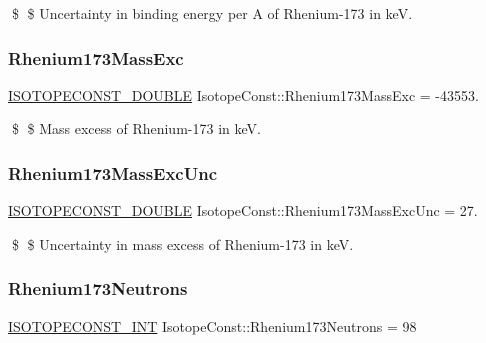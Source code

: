 \$ \$ Uncertainty in binding energy per A of Rhenium-\/173 in keV. \mbox{\label{group___isotope_const-_rhenium-_re173_ga42e0b910e3ee2c6df3f6557be1d74de4}} 
\subsubsection{\texorpdfstring{Rhenium173\+Mass\+Exc}{Rhenium173MassExc}}
{\footnotesize\ttfamily \mbox{\hyperlink{group___isotope_const-_macros_ga8f45a7272ce02c0b4c65c44636ed719a}{I\+S\+O\+T\+O\+P\+E\+C\+O\+N\+S\+T\+\_\+\+D\+O\+U\+B\+LE}} Isotope\+Const\+::\+Rhenium173\+Mass\+Exc = -\/43553.}

\$ \$ Mass excess of Rhenium-\/173 in keV. \mbox{\label{group___isotope_const-_rhenium-_re173_ga26d5428d8bbc3267181acecefe50bfcd}} 
\subsubsection{\texorpdfstring{Rhenium173\+Mass\+Exc\+Unc}{Rhenium173MassExcUnc}}
{\footnotesize\ttfamily \mbox{\hyperlink{group___isotope_const-_macros_ga8f45a7272ce02c0b4c65c44636ed719a}{I\+S\+O\+T\+O\+P\+E\+C\+O\+N\+S\+T\+\_\+\+D\+O\+U\+B\+LE}} Isotope\+Const\+::\+Rhenium173\+Mass\+Exc\+Unc = 27.}

\$ \$ Uncertainty in mass excess of Rhenium-\/173 in keV. \mbox{\label{group___isotope_const-_rhenium-_re173_gad195a17871d0e1067a87ea85cd9299b4}} 
\subsubsection{\texorpdfstring{Rhenium173\+Neutrons}{Rhenium173Neutrons}}
{\footnotesize\ttfamily \mbox{\hyperlink{group___isotope_const-_macros_ga5f18360b3e99483a35c32d789e62621c}{I\+S\+O\+T\+O\+P\+E\+C\+O\+N\+S\+T\+\_\+\+I\+NT}} Isotope\+Const\+::\+Rhenium173\+Neutrons = 98}

